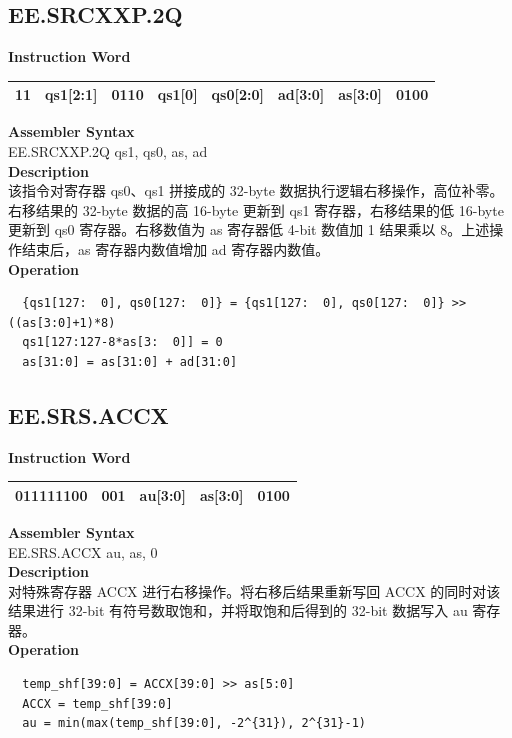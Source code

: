 \clearpage
\subsection{EE.SRCXXP.2Q}\label{instruction:EESRCXXP2Q}
\setlength\tabcolsep{6pt}
\textbf{Instruction Word} \\
\begin{tabular}{|c|c|c|c|c|c|c|c|}
	\hline
	11 & qs1[2:1] & 0110 & qs1[0] & qs0[2:0] & ad[3:0] & as[3:0] & 0100 \\
	\hline
\end{tabular}

\textbf{Assembler Syntax} \\
EE.SRCXXP.2Q qs1, qs0, as, ad \\
\textbf{Description} \\
该指令对寄存器 qs0、qs1 拼接成的 32-byte 数据执行逻辑右移操作，高位补零。右移结果的 32-byte 数据的高 16-byte 更新到 qs1 寄存器，右移结果的低 16-byte 更新到 qs0 寄存器。右移数值为 as 寄存器低 4-bit 数值加 1 结果乘以 8。上述操作结束后，as 寄存器内数值增加 ad 寄存器内数值。\\
\textbf{Operation}
\begin{lstlisting}
  {qs1[127:  0], qs0[127:  0]} = {qs1[127:  0], qs0[127:  0]} >> ((as[3:0]+1)*8)
  qs1[127:127-8*as[3:  0]] = 0
  as[31:0] = as[31:0] + ad[31:0]
\end{lstlisting}

\clearpage
\subsection{EE.SRS.ACCX}\label{instruction:EESRSACCX}
\setlength\tabcolsep{6pt}
\textbf{Instruction Word} \\
\begin{tabular}{|c|c|c|c|c|}
	\hline
	011111100 & 001 & au[3:0] & as[3:0] & 0100 \\
	\hline
\end{tabular}

\textbf{Assembler Syntax} \\
EE.SRS.ACCX au, as, 0 \\
\textbf{Description} \\
对特殊寄存器 ACCX 进行右移操作。将右移后结果重新写回 ACCX 的同时对该结果进行 32-bit 有符号数取饱和，并将取饱和后得到的 32-bit 数据写入 au 寄存器。\\
\textbf{Operation}
\begin{lstlisting}
  temp_shf[39:0] = ACCX[39:0] >> as[5:0]
  ACCX = temp_shf[39:0]
  au = min(max(temp_shf[39:0], -2^{31}), 2^{31}-1)
\end{lstlisting}

